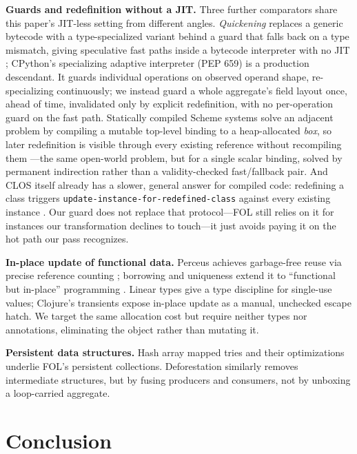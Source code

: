 \documentclass[sigplan,screen,review,anonymous]{acmart}
\begin{document}
\textbf{Guards and redefinition without a JIT.} Three further comparators
share this paper's JIT-less setting from different angles. \emph{Quickening}
replaces a generic bytecode with a type-specialized variant behind a guard
that falls back on a type mismatch, giving speculative fast paths inside a
bytecode interpreter with no JIT \cite{brunthaler2010efficient};
CPython's specializing adaptive interpreter (PEP 659) is a production
descendant. It guards individual operations on observed operand shape,
re-specializing continuously; we instead guard a whole aggregate's field
layout once, ahead of time, invalidated only by explicit redefinition,
with no per-operation guard on the fast path. Statically
compiled Scheme systems solve an adjacent problem by compiling a mutable
top-level binding to a heap-allocated \emph{box}, so later redefinition
is visible through every existing reference without recompiling them
\cite{kranz1986orbit}---the same open-world problem, but for a single
scalar binding, solved by permanent indirection rather than a
validity-checked fast/fallback pair. And CLOS itself already has a slower,
general answer for compiled code: redefining a class triggers
\texttt{update-instance-for-redefined-class} against every existing
instance \cite{kiczales1991art}. Our guard does not replace that
protocol---FOL still relies on it for instances our transformation
declines to touch---it just avoids paying it on the hot path our pass
recognizes.

\textbf{In-place update of functional data.} Perceus achieves garbage-free
reuse via precise reference counting \cite{reinking2021perceus}; borrowing
and uniqueness extend it to ``functional but in-place'' programming
\cite{lorenzen2023functional}. Linear types \cite{wadler1990linear} give a
type discipline for single-use values; Clojure's transients
\cite{hickey2008clojure} expose in-place update as a manual, unchecked
escape hatch. We target the same allocation cost but require neither
types nor annotations, eliminating the object rather than mutating it.

\textbf{Persistent data structures.} Hash array mapped tries
\cite{bagwell2001ideal} and their optimizations \cite{steindorfer2015optimizing}
underlie FOL's persistent collections. Deforestation
\cite{wadler1990deforestation} similarly removes intermediate structures,
but by fusing producers and consumers, not by unboxing a loop-carried
aggregate.

\section{Conclusion}
\end{document}
